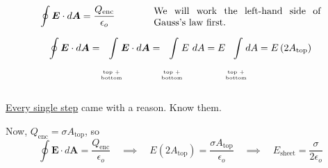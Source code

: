 \documentclass{article}
\numberwithin{equation}{section}
\newcommand{\bunny}[1][]{
    \tikz \fill [scale=1ex/500,yscale=1,#1] svg "M3831 8683 c-70 -71 -235 -358 -326 -567 -168 -385 -252 -748 -275 -1181 -5 -104 -9 -199 -7 -209 2 -16 -10 -21 -88 -36 -158 -31 -407 -112 -530 -173 -117 -58 -239 -150 -365 -277 -178 -177 -305 -366 -407 -604 -44 -102 -55 -118 -136 -201 -110 -113 -148 -183 -154 -288 -4 -53 0 -88 14 -132 12 -37 16 -70 12 -85 -4 -14 -7 -62 -8 -107 -3 -225 125 -386 369 -461 66 -20 157 -35 282 -47 l68 -7 -25 -47 c-41 -81 -59 -197 -52 -341 10 -200 66 -413 174 -660 153 -347 352 -632 640 -914 l104 -102 9 -95 c13 -131 12 -378 -1 -441 -25 -115 -92 -205 -180 -242 -138 -58 -168 -77 -220 -139 -92 -109 -110 -180 -63 -237 63 -75 165 -100 429 -107 159 -4 215 -2 275 11 267 57 455 273 539 619 20 84 29 107 41 103 8 -3 89 -37 179 -76 197 -86 466 -177 651 -220 74 -18 142 -34 150 -37 8 -3 -14 -15 -50 -28 -257 -88 -340 -205 -227 -319 48 -47 82 -58 257 -78 225 -26 1652 -9 1850 23 75 12 154 51 184 92 22 30 23 43 15 268 -3 65 0 83 25 133 50 102 131 161 255 187 46 9 67 8 150 -11 230 -54 428 -7 556 131 71 77 99 149 92 240 -7 115 -65 203 -185 282 -218 145 -282 308 -264 665 30 563 -100 1035 -383 1397 -78 99 -236 254 -335 327 -319 238 -731 392 -1245 468 -301 44 -438 49 -1090 37 -69 -2 -107 3 -160 20 l-70 22 3 238 c3 183 0 265 -12 356 -18 123 -53 275 -81 340 -16 38 -16 40 9 70 456 567 686 1088 725 1647 21 289 -41 691 -116 749 -28 23 -72 27 -106 10 -63 -31 -322 -342 -452 -541 -38 -59 -73 -108 -77 -108 -5 0 -8 11 -8 24 0 14 -9 74 -21 133 -44 228 -158 517 -217 547 -50 26 -80 20 -121 -21z";
}
\begin{document}
\begin{minipage}{0.4\textwidth}
\begin{flushleft}
\begin{figure}[H]
\label{fig:2:g}
\end{figure}
\end{flushleft}
\end{minipage}
~
\begin{minipage}{0.6\textwidth}
\begin{flushright}
\begin{equation*}
    \oint \bm{E} \cdot d\bm{A} = \frac{Q_{\text{enc}}}{\epsilon_o} \qquad\qquad \parbox[c]{0.5\textwidth}{We will work the left-hand side of Gauss's law first.}
\end{equation*}
\parbox[c]{\textwidth}{\begin{equation*} \oint \bm{E} \cdot d\bm{A} = \hspace{-0.2cm} \int\limits_{\parbox[c]{0.1\textwidth}{\begin{center} \tiny top + \\ bottom \end{center}}} \hspace{-0.4cm} \bm{E} \cdot d\bm{A} = \hspace{-0.2cm} \int\limits_{\parbox[c]{0.1\textwidth}{\begin{center} \tiny top + \\ bottom \end{center}}} \hspace{-0.4cm} E\ dA = E \hspace{-0.2cm} \int\limits_{\parbox[c]{0.1\textwidth}{\begin{center} \tiny top + \\ bottom \end{center}}} \hspace{-0.4cm} dA = E \left( 2 A_{\text{top}} \right) \end{equation*}}
\parbox[c]{\textwidth}{\underline{Every single step} came with a reason. Know them.}
\end{flushright}
\end{minipage}

Now, $\displaystyle Q_{\text{enc}} = \sigma A_{\text{top}}$, so
\begin{equation*}
    \oint \bm{E} \cdot d\bm{A} = \frac{Q_{\text{enc}}}{\epsilon_o} \quad \implies \quad E \left( 2 A_{\text{top}} \right) = \frac{\sigma A_{\text{top}}}{\epsilon_o} \quad \implies \quad \boxed{E_{\text{sheet}} = \frac{\sigma}{2\epsilon_o}}
\end{equation*}
\end{document}
